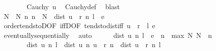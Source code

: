 \begin{isabellebody}
\ \ \ \ \ \ \isamarkupfalse%
\ {\isacartoucheopen}Cauchy\ u{\isacartoucheclose}\ \isamarkupfalse%
\ Cauchy{\isacharunderscore}{\kern0pt}def\ \isamarkupfalse%
\ blast\isanewline
\ \ \ \ \isamarkupfalse%
\ N{}\ \ N{}{\isacharcolon}{\kern0pt}\ {\isachardoublequoteopen}{\isasymAnd}n{\isachardot}{\kern0pt}\ n\ {\isasymge}\ N{}\ {\isasymLongrightarrow}\ dist\ {\isacharparenleft}{\kern0pt}{\isacharparenleft}{\kern0pt}u\ {\isasymcirc}\ r{\isacharparenright}{\kern0pt}\ n{\isacharparenright}{\kern0pt}\ l\ {\isacharless}{\kern0pt}\ e\ {\isacharslash}{\kern0pt}\ {}{\isachardoublequoteclose}\isanewline
\ \ \ \ \ \ \isamarkupfalse%
\ order{\isacharunderscore}{\kern0pt}tendstoD{\isacharparenleft}{\kern0pt}{}{\isacharparenright}{\kern0pt}{\isacharbrackleft}{\kern0pt}OF\ iffD{}{\isacharbrackleft}{\kern0pt}OF\ tendsto{\isacharunderscore}{\kern0pt}dist{\isacharunderscore}{\kern0pt}iff\ {\isacartoucheopen}{\isacharparenleft}{\kern0pt}u\ {\isasymcirc}\ r{\isacharparenright}{\kern0pt}\ {\isasymlonglonglongrightarrow}\ l{\isacartoucheclose}{\isacharbrackright}{\kern0pt}\ {\isacartoucheopen}e{\isacharslash}{\kern0pt}{}\ {\isachargreater}{\kern0pt}\ {}{\isacartoucheclose}{\isacharbrackright}{\kern0pt}\isanewline
\ \ \ \ \ \ \isamarkupfalse%
\ eventually{\isacharunderscore}{\kern0pt}sequentially\ \isamarkupfalse%
\ auto\isanewline
\ \ \ \ \isamarkupfalse%
\ {\isachardoublequoteopen}dist\ {\isacharparenleft}{\kern0pt}u\ n{\isacharparenright}{\kern0pt}\ l\ {\isacharless}{\kern0pt}\ e{\isachardoublequoteclose}\ \ {\isachardoublequoteopen}n\ {\isasymge}\ max\ N{}\ N{}{\isachardoublequoteclose}\ \ n\isanewline
\ \ \ \ \isamarkupfalse%
\ {\isacharminus}{\kern0pt}\isanewline
\ \ \ \ \ \ \isamarkupfalse%
\ {\isachardoublequoteopen}dist\ {\isacharparenleft}{\kern0pt}u\ n{\isacharparenright}{\kern0pt}\ l\ {\isasymle}\ dist\ {\isacharparenleft}{\kern0pt}u\ n{\isacharparenright}{\kern0pt}\ {\isacharparenleft}{\kern0pt}{\isacharparenleft}{\kern0pt}u\ {\isasymcirc}\ r{\isacharparenright}{\kern0pt}\ n{\isacharparenright}{\kern0pt}\ {\isacharplus}{\kern0pt}\ dist\ {\isacharparenleft}{\kern0pt}{\isacharparenleft}{\kern0pt}u\ {\isasymcirc}\ r{\isacharparenright}{\kern0pt}\ n{\isacharparenright}{\kern0pt}\ l{\isachardoublequoteclose}\isanewline
\ \ \ \ \ \ \ \ \isamarkupfalse%

\end{isabellebody}
